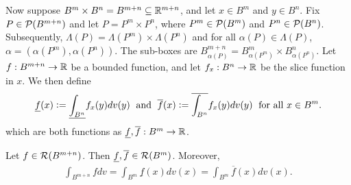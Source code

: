 Now suppose $B^{m} \times B^{n} = B^{m + n} \subseteq \mathbb{R}^{m+n}$, and let $x \in B^{m}$ and $y \in B^{n}$. Fix $P \in \mathcal{P}(B^{m+n})$ and let $P = P^{m} \times P^{n}$, where $P^{m} \in \mathcal{P}(B^{m})$ and $P^{n} \in \mathcal{P}(B^{n})$. Subsequently, $\Lambda(P) = \Lambda(P^{m}) \times \Lambda(P^{n})$ and for all $\alpha(P) \in \Lambda(P)$, $\alpha = (\alpha(P^{m}),\alpha(P^{n}))$. The sub-boxes are $B_{\alpha(P)}^{m+n} = B_{\alpha(P^{m})}^{m} \times B_{\alpha(P^{n})}^{n}$. Let $f:B^{m+n} \to \mathbb{R}$ be a bounded function, and let $f_{x} :B^{n} \to \mathbb{R}$ be the slice function in $x$. We then define
\begin{align}
    \underline{f}(x) \vcentcolon= \underline{\int_{B^{n}}} f_{x}(y) dv(y) \;\text{ and }\; \overline{f}(x) \vcentcolon= \overline{\int_{B^{n}}} f_{x}(y) dv(y) \;\text{ for all } x \in B^{m}.
\end{align}
which are both functions as $\underline{f},\overline{f}:B^{m} \to \mathbb{R}$.

\begin{theorem}
    Let $f \in \mathcal{R}(B^{m+n})$. Then $\underline{f},\overline{f} \in \mathcal{R}(B^{m})$. Moreover,
    \begin{align}
        \int_{B^{m+n}} f dv = \int_{B^{m}} \underline{f}(x) dv(x) = \int_{B^{m}} \overline{f}(x) dv(x).
    \end{align}
\end{theorem}

